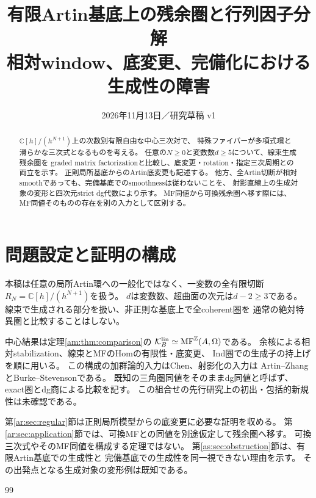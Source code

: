 
\title{有限Artin基底上の残余圏と行列因子分解\\
\large 相対window、底変更、完備化における生成性の障害}
\author{}
\date{2026年11月13日／研究草稿 v1}

\maketitle
\begin{abstract}
$\mathbb C[h]/(h^{N+1})$上の次数別有限自由な中心三次対で、
特殊ファイバーが多項式環と滑らかな三次式となるものを考える。
任意の$N\ge0$と変数数$d\ge5$について、線束生成残余圏を
graded matrix factorizationと比較し、底変更・rotation・指定三次周期との両立を示す。
正則局所基底からのArtin底変更も記述する。
他方、全Artin切断が相対smoothであっても、完備基底でのsmoothnessは従わないことを、
射影直線上の生成対象の変形と四次元strict dg代数により示す。
MF同値から可換残余圏へ移す際には、MF同値そのものの存在を別の入力として区別する。
\end{abstract}

\section*{問題設定と証明の構成}
本稿は任意の局所Artin環への一般化ではなく、一変数の全有限切断
$R_N=\mathbb C[h]/(h^{N+1})$を扱う。
$d$は変数数、超曲面の次元は$d-2\ge3$である。
線束で生成される部分を扱い、非正則な基底上で全coherent圏を
通常の絶対特異圏と比較することはしない。

中心結果は定理\ref{am:thm:comparison}の
$\mathcal K_B^{\rm lin}\simeq\operatorname{MF}^{\mathbb Z}(A,\Omega)$である。
余核による相対stabilization、線束とMFのHomの有限性・底変更、
Ind圏での生成子の持上げを順に用いる。
この構成の加群論的入力はChen\cite{AMChen}、射影化の入力は
Artin--Zhang\cite{LP-AZ}とBurke--Stevenson\cite{LP-BS}である。
既知の三角圏同値をそのままdg同値と呼ばず、exact圏とdg商による比較を記す。
この組合せの先行研究上の初出・包括的新規性は未確認である。

第\ref{ar:sec:regular}節は正則局所模型からの底変更に必要な証明を収める。
第\ref{ar:sec:application}節では、可換MFとの同値を別途仮定して残余圏へ移す。
可換三次式やそのMF同値を構成する定理ではない。
第\ref{as:sec:obstruction}節は、有限Artin基底での生成性と
完備基底での生成性を同一視できない理由を示す。
その出発点となる生成対象の変形例は既知である\cite{AMSasha}。





\begin{thebibliography}{99}

\end{thebibliography}

